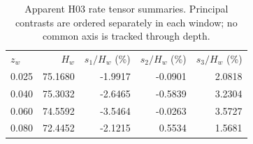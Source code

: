 \begin{table}[t]\caption{Apparent H03 rate tensor summaries. Principal contrasts are ordered separately in each window; no common axis is tracked through depth.}\label{tab:rates}\begin{ruledtabular}\begin{tabular}{lrrrr}$z_w$ & $H_w$ & $s_1/H_w$ (\%) & $s_2/H_w$ (\%) & $s_3/H_w$ (\%)\\
0.025 & 75.1680 & -1.9917 & -0.0901 & 2.0818\\
0.040 & 75.3032 & -2.6465 & -0.5839 & 3.2304\\
0.060 & 74.5592 & -3.5464 & -0.0263 & 3.5727\\
0.080 & 72.4452 & -2.1215 & 0.5534 & 1.5681\\
\end{tabular}\end{ruledtabular}\end{table}
